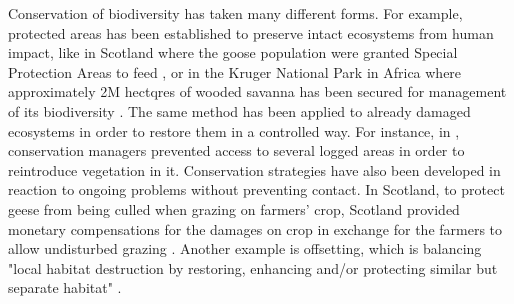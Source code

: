 \documentclass[12pt,a4paper]{article}
\begin{document}
Conservation of biodiversity has taken many different forms.
For example, protected areas has been established to preserve intact ecosystems from human impact, like in Scotland where the goose population were granted Special Protection Areas to feed \cite{bainbridge2017goose}, or in the Kruger National Park in Africa where approximately 2M hectqres of wooded savanna has been secured for management of its biodiversity \cite{vanwilgen2011critical}.
The same method has been applied to already damaged ecosystems in order to restore them in a controlled way.
For instance, in \citep{rumpff2011state}, conservation managers prevented access to several logged areas in order to reintroduce vegetation in it. 
Conservation strategies have also been developed in reaction to ongoing problems without preventing contact.
In Scotland, to protect geese from being culled when grazing on farmers' crop, Scotland provided monetary compensations for the damages on crop in exchange for the farmers to allow undisturbed grazing \citep{bainbridge2017goose, cusack2018time}.
Another example is offsetting, which is balancing "local habitat destruction by restoring, enhancing and/or protecting similar but separate habitat" \citep{gordon2011assessing}.
\end{document}
